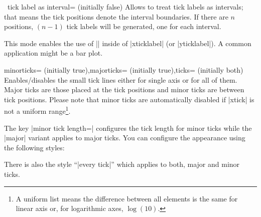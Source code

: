 \begin{pgfplotsxykey}{\x\ tick label as interval= (initially false)}
\label{key:pgfplots:ticklabelasinterval}
	Allows to treat tick labels as intervals; that means the tick positions denote the interval boundaries. If there are $n$ positions, $(n-1)$ tick labels will be generated, one for each interval.
\begin{codeexample}[]
\end{codeexample}
	This mode enables the use of |\nexttick| inside of |xticklabel| (or |yticklabel|). A common application might be a bar plot.
\begin{codeexample}[]
\end{codeexample}
\end{pgfplotsxykey}



\begin{pgfplotsxykeylist}{\x minorticks= (initially true),\x majorticks= (initially true),ticks= (initially both)}
Enables/disables the small tick lines either for single axis or for all of them. Major ticks are those placed at the tick positions and minor ticks are between tick positions. Please note that minor ticks are automatically disabled if |xtick| is not a uniform range\footnote{A uniform list means the difference between all elements is the same for linear axis or, for logarithmic axes, $\log(10)$.}.

The key |minor tick length=| configures the tick length for minor ticks while the |major| variant applies to major ticks.
You can configure the appearance using the following styles:
\begin{codeexample}
\end{codeexample}
There is also the style ``|every tick|'' which applies to both, major and minor ticks.
\end{pgfplotsxykeylist}

